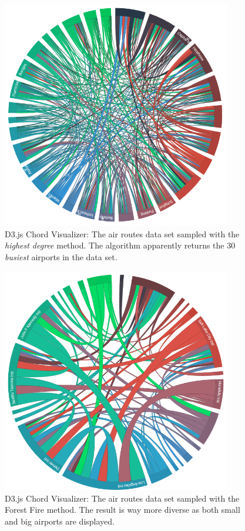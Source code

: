 \begin{figure}
	\centering
	\includegraphics[width=100mm]{img/07_chord_highest_degree}
	\caption{D3.js Chord Visualizer: The air routes data set sampled with the \emph{highest degree} method. The algorithm apparently returns the 30 \emph{busiest} airports in the data set.}
    \label{fig:chord-highest-degree}
\end{figure}

\begin{figure}
	\centering
	\includegraphics[width=100mm]{img/07_chord_forest_fire}
	\caption{D3.js Chord Visualizer: The air routes data set sampled with the Forest Fire method. The result is way more diverse as both small and big airports are displayed.}
    \label{fig:chord-forest-fire}
\end{figure}

